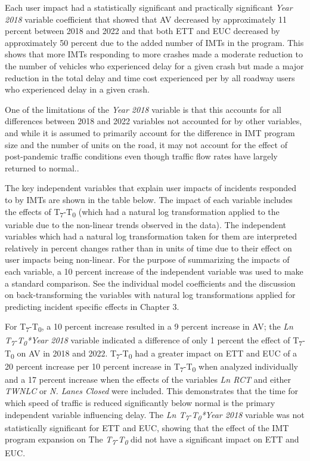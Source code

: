 \documentclass[
  letterpaper,
  authoryear]{elsarticle}
\begin{document}
Each user impact had a statistically significant and practically
significant \emph{Year 2018} variable coefficient that showed that AV
decreased by approximately 11 percent between 2018 and 2022 and that
both ETT and EUC decreased by approximately 50 percent due to the added
number of IMTs in the program. This shows that more IMTs responding to
more crashes made a moderate reduction to the number of vehicles who
experienced delay for a given crash but made a major reduction in the
total delay and time cost experienced per by all roadway users who
experienced delay in a given crash.

One of the limitations of the \emph{Year 2018} variable is that this
accounts for all differences between 2018 and 2022 variables not
accounted for by other variables, and while it is assumed to primarily
account for the difference in IMT program size and the number of units
on the road, it may not account for the effect of post-pandemic traffic
conditions even though traffic flow rates have largely returned to
normal..

The key independent variables that explain user impacts of incidents
responded to by IMTs are shown in the table below. The impact of each
variable includes the effects of T\textsubscript{7}-T\textsubscript{0}
(which had a natural log transformation applied to the variable due to
the non-linear trends observed in the data). The independent variables
which had a natural log transformation taken for them are interpreted
relatively in percent changes rather than in units of time due to their
effect on user impacts being non-linear. For the purpose of summarizing
the impacts of each variable, a 10 percent increase of the independent
variable was used to make a standard comparison. See the individual
model coefficients and the discussion on back-transforming the variables
with natural log transformations applied for predicting incident
specific effects in Chapter 3.

For T\textsubscript{7}-T\textsubscript{0}, a 10 percent increase
resulted in a 9 percent increase in AV; the \emph{Ln
T\textsubscript{7}-T\textsubscript{0}*Year 2018} variable indicated a
difference of only 1 percent the effect of
T\textsubscript{7}-T\textsubscript{0} on AV in 2018 and 2022.
T\textsubscript{7}-T\textsubscript{0} had a greater impact on ETT and
EUC of a 20 percent increase per 10 percent increase in
T\textsubscript{7}-T\textsubscript{0} when analyzed individually and a
17 percent increase when the effects of the variables \emph{Ln RCT} and
either \emph{TWNLC} or \emph{N. Lanes Closed} were included. This
demonstrates that the time for which speed of traffic is reduced
significantly below normal is the primary independent variable
influencing delay. The \emph{Ln
T\textsubscript{7}-T\textsubscript{0}*Year 2018} variable was not
statistically significant for ETT and EUC, showing that the effect of
the IMT program expansion on The
\emph{T\textsubscript{7}-T\textsubscript{0}} did not have a significant
impact on ETT and EUC.
\end{document}
